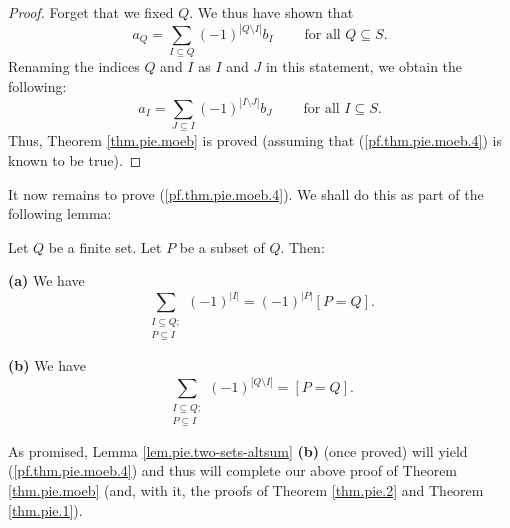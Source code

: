 \begin{proof}
Forget that we fixed $Q$. We thus have shown that%
\[
a_{Q}=\sum_{I\subseteq Q}\left(  -1\right)  ^{\left\vert Q\setminus
I\right\vert }b_{I}\ \ \ \ \ \ \ \ \ \ \text{for all }Q\subseteq S.
\]
Renaming the indices $Q$ and $I$ as $I$ and $J$ in this statement, we obtain
the following:%
\[
a_{I}=\sum_{J\subseteq I}\left(  -1\right)  ^{\left\vert I\setminus
J\right\vert }b_{J}\ \ \ \ \ \ \ \ \ \ \text{for all }I\subseteq S.
\]
Thus, Theorem \ref{thm.pie.moeb} is proved (assuming that
(\ref{pf.thm.pie.moeb.4}) is known to be true).
\end{proof}

It now remains to prove (\ref{pf.thm.pie.moeb.4}). We shall do this as part of
the following lemma:

\begin{lemma}
\label{lem.pie.two-sets-altsum}Let $Q$ be a finite set. Let $P$ be a subset of
$Q$. Then: \medskip

\textbf{(a)} We have%
\begin{equation}
\sum_{\substack{I\subseteq Q;\\P\subseteq I}}\left(  -1\right)  ^{\left\vert
I\right\vert }=\left(  -1\right)  ^{\left\vert P\right\vert }\left[
P=Q\right]  . \label{eq.lem.pie.two-sets-altsum.a}%
\end{equation}


\textbf{(b)} We have%
\begin{equation}
\sum_{\substack{I\subseteq Q;\\P\subseteq I}}\left(  -1\right)  ^{\left\vert
Q\setminus I\right\vert }=\left[  P=Q\right]  .
\label{eq.lem.pie.two-sets-altsum.b}%
\end{equation}

\end{lemma}

As promised, Lemma \ref{lem.pie.two-sets-altsum} \textbf{(b)} (once proved)
will yield (\ref{pf.thm.pie.moeb.4}) and thus will complete our above proof of
Theorem \ref{thm.pie.moeb} (and, with it, the proofs of Theorem
\ref{thm.pie.2} and Theorem \ref{thm.pie.1}).

